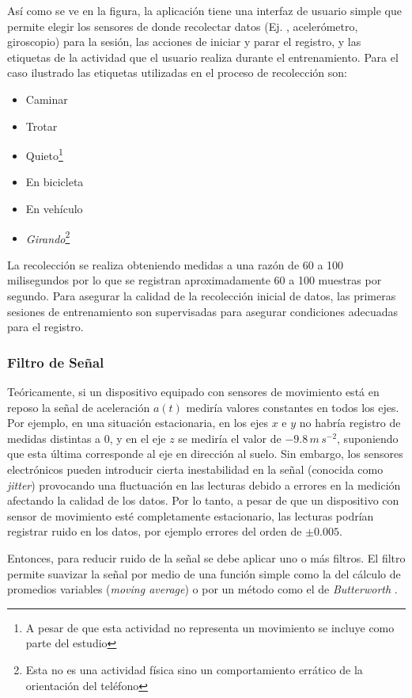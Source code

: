 Así como se ve en la figura, la aplicación tiene una interfaz de usuario
simple que permite elegir los sensores de donde recolectar datos (Ej.
, acelerómetro, giroscopio) para la sesión, las acciones
de iniciar y parar el registro, y las etiquetas de la actividad que
el usuario realiza durante el entrenamiento. Para el caso ilustrado
las etiquetas utilizadas en el proceso de recolección son:
\begin{itemize}
\item Caminar
\item Trotar
\item Quieto\footnote{A pesar de que esta actividad no representa un movimiento se incluye
como parte del estudio}
\item En bicicleta
\item En vehículo
\item \emph{Girando}\footnote{Esta no es una actividad física sino un comportamiento errático de
la orientación del teléfono}
\end{itemize}
La recolección se realiza obteniendo medidas a una razón de 60 a 100
milisegundos por lo que se registran aproximadamente 60 a 100 muestras
por segundo. Para asegurar la calidad de la recolección inicial de
datos, las primeras sesiones de entrenamiento son supervisadas para
asegurar condiciones adecuadas para el registro.

\subsubsection{Filtro de Señal}

\label{ssec44:filtering}Teóricamente, si un dispositivo equipado
con sensores de movimiento está en reposo la señal de aceleración
$a(t)$ mediría valores constantes en todos los ejes. Por ejemplo,
en una situación estacionaria, en los ejes $x$ e $y$ no habría registro
de medidas distintas a $0$, y en el eje $z$ se mediría el valor
de $-9.8\,m\,s^{-2}$, suponiendo que esta última corresponde al eje
en dirección al suelo. Sin embargo, los sensores electrónicos pueden
introducir cierta inestabilidad en la señal (conocida como \emph{jitter})
provocando una fluctuación en las lecturas debido a errores en la
medición afectando la calidad de los datos. Por lo tanto, a pesar
de que un dispositivo con sensor de movimiento esté completamente
estacionario, las lecturas podrían registrar ruido en los datos, por
ejemplo errores del orden de $\pm0.005$. 

Entonces, para reducir ruido de la señal se debe aplicar uno o más
filtros. El filtro permite suavizar la señal por medio de una función
simple como la del cálculo de promedios variables (\emph{moving average})
o por un método como el de \emph{Butterworth} \cite{ReyesOrtiz2015}. 


